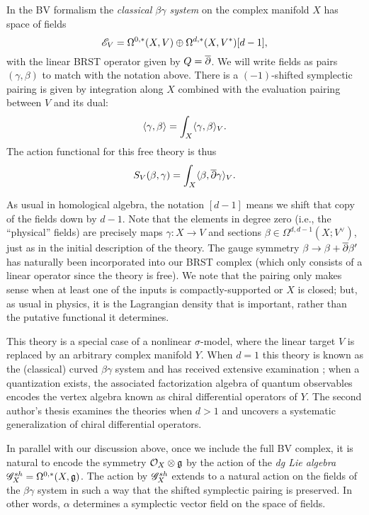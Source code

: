\begin{dfn}
In the BV formalism the {\em classical $\beta\gamma$ system} on the complex manifold $X$ has space of fields
\[
\mathscr E_V = \Omega^{0,*}(X , V) \oplus \Omega^{d,*}(X , V^*)[d-1],
\]
with the linear BRST operator given by $Q = \overline{\partial}$.
We will write fields as pairs $(\gamma,\beta)$ to match with the notation above.
There is a $(-1)$-shifted symplectic pairing is given by integration along $X$ combined with the evaluation pairing between $V$ and its dual: 
\[
\langle\gamma, \beta\rangle = \int_X \langle\gamma, \beta\rangle_V.
\] 
The action functional for this free theory is thus
\[
S_V (\beta,\gamma) = \int_X \langle\beta, \overline{\partial} \gamma\rangle_{V} .
\]
\end{dfn}

\begin{rmk}
As usual in homological algebra, the notation $[d-1]$ means we shift that copy of the fields down by $d-1$. 
Note that the elements in degree zero (i.e., the ``physical'' fields) are precisely maps $\gamma : X \to V$ and sections $\beta \in\Omega^{d,d-1} (X ; V^\vee)$, just as in the initial description of the theory. 
The gauge symmetry $\beta \to \beta + \overline{\partial} \beta'$ has naturally been incorporated into our BRST complex (which only consists of a linear operator since the theory is free).
We note that the pairing only makes sense when at least one of the inputs is compactly-supported or $X$ is closed;
but, as usual in physics, it is the Lagrangian density that is important, rather than the putative functional it determines.
\end{rmk}

\begin{rmk}
This theory is a special case of a nonlinear $\sigma$-model, where the linear target $V$ is replaced by an arbitrary complex manifold $Y$.
When $d=1$ this theory is known as the (classical) curved $\beta\gamma$ system and has received extensive examination \cite{WittenCDO, WG2, Nek, GGW};
when a quantization exists, the associated factorization algebra of quantum observables encodes the vertex algebra known as chiral differential operators of $Y$.
The second author's thesis \cite{BWthesis} examines the theories when $d>1$ and uncovers a systematic generalization of chiral differential operators.
\end{rmk}

In parallel with our discussion above, once we include the full BV complex, 
it is natural to encode the symmetry $\mathcal O_X \otimes \mathfrak g$ by the action of  the {\em dg Lie algebra} $\mathscr G_X^{sh} = \Omega^{0,*}(X, \mathfrak g)$. 
The action by $\mathscr G_X^{sh}$ extends to a natural action on the fields of the $\beta\gamma$ system in such a way that the shifted symplectic pairing is preserved. 
In other words, $\alpha$ determines a symplectic vector field on the space of fields.

